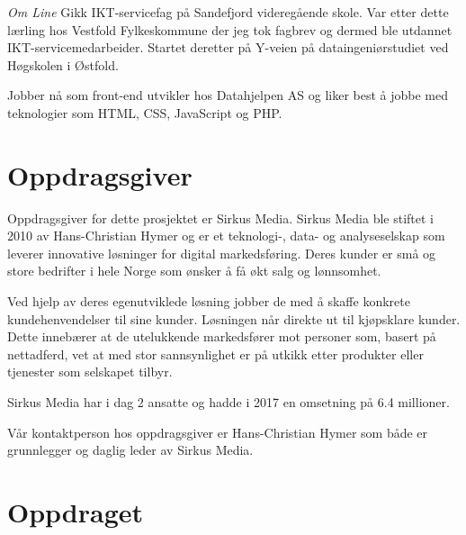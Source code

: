 \textit{Om Line}
Gikk IKT-servicefag på Sandefjord videregående skole. Var etter dette lærling hos Vestfold Fylkeskommune der jeg tok fagbrev og dermed ble utdannet IKT-servicemedarbeider. Startet deretter på Y-veien på dataingeniørstudiet ved Høgskolen i Østfold. 

Jobber nå som front-end utvikler hos Datahjelpen AS og liker best å jobbe med teknologier som HTML, CSS, JavaScript og PHP.

\section{Oppdragsgiver}

Oppdragsgiver for dette prosjektet er Sirkus Media.
Sirkus Media ble stiftet i 2010 av Hans-Christian Hymer og er et teknologi-, data- og analyseselskap som leverer innovative løsninger for digital markedsføring. Deres kunder er små og store bedrifter i hele Norge som ønsker å få økt salg og lønnsomhet. 

Ved hjelp av deres egenutviklede løsning jobber de med å skaffe konkrete kundehenvendelser til sine kunder. Løsningen når direkte ut til kjøpsklare kunder. Dette innebærer at de utelukkende markedsfører mot personer som, basert på nettadferd, vet at med stor sannsynlighet er på utkikk etter produkter eller tjenester som selskapet tilbyr.

Sirkus Media har i dag 2 ansatte og hadde i 2017 en omsetning på 6.4 millioner.

Vår kontaktperson hos oppdragsgiver er Hans-Christian Hymer som både er grunnlegger og daglig leder av Sirkus Media. 

\section{Oppdraget}
\label{sec:oppgaven}




